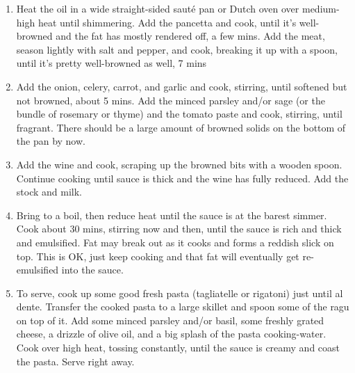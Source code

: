 \documentclass[]{report}
\begin{document}
            {\begin{enumerate}    %
                  \item   Heat the oil in a wide straight-sided sauté pan or Dutch oven over medium-high heat until shimmering. Add the pancetta and cook, until it's well-browned and the fat has mostly rendered off, a few mins. Add the meat, season lightly with salt and pepper, and cook, breaking it up with a spoon, until it's pretty well-browned as well, 7 mins
                  \item Add the onion, celery, carrot, and garlic and cook, stirring, until softened but not browned, about 5 mins. Add the minced parsley and/or sage (or the bundle of rosemary or thyme) and the tomato paste and cook, stirring, until fragrant. There should be a large amount of browned solids on the bottom of the pan by now.
                  \item Add the wine and cook, scraping up the browned bits with a wooden spoon. Continue cooking until sauce is thick and the wine has fully reduced. Add the stock and milk.
                  \item Bring to a boil, then reduce heat until the sauce is at the barest simmer. Cook about 30 mins, stirring now and then, until the sauce is rich and thick and emulsified. Fat may break out as it cooks and forms a reddish slick on top. This is OK, just keep cooking and that fat will eventually get re-emulsified into the sauce.
                  \item  To serve, cook up some good fresh pasta (tagliatelle or rigatoni) just until al dente. Transfer the cooked pasta to a large skillet and spoon some of the ragu on top of it. Add some minced parsley and/or basil, some freshly grated cheese, a drizzle of olive oil, and a big splash of the pasta cooking-water. Cook over high heat, tossing constantly, until the sauce is creamy and coast the pasta. Serve right away.
            \end{enumerate}}
\end{document}
